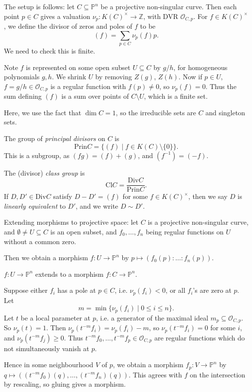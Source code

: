 \documentclass[12pt]{article}
\begin{document}
The setup is follows: let $C \subseteq \mathbb{P}^n$ be a projective non-singular curve. Then each point $p \in C$ gives a valuation $\nu_p : K(C)^\times \to \mathbb{Z}$, with DVR $\mathcal{O}_{C, p}$. For $f \in K(C)^\times$, we define the divisor of zeros and poles of $f$ to be
\[
	(f) = \sum_{p \in C} \nu_p(f) p.
\]
We need to check this is finite.

Note $f$ is represented on some open subset $U \subseteq C$ by $g/h$, for homogeneous polynomials $g, h$. We shrink $U$ by removing $Z(g)$, $Z(h)$. Now if $p \in U$, $f = g/h \in \mathcal{O}_{C, p}$ is a regular function with $f(p) \neq 0$, so $\nu_p(f) = 0$. Thus the sum defining $(f)$ is a sum over points of $C \setminus U$, which is a finite set.

Here, we use the fact that $\dim C = 1$, so the irreducible sets are $C$ and singleton sets.

\begin{definition}
	The group of \emph{principal divisors} on $C$ is
	\[
		\mathrm{Prin} C = \{(f) \mid f \in K(C) \setminus \{0\}\}.
	\]
	This is a subgroup, as $(fg) = (f) + (g)$, and $(f^{-1}) = (-f)$.

	The (divisor) \emph{class group} is
	\[
	\mathrm{Cl} C = \frac{\mathrm{Div} C}{\mathrm{Prin} C}.
	\]
	If $D, D' \in \mathrm{Div} C$ satisfy $D - D' = (f)$ for some $f \in K(C)^\times$, then we say $D$ is \emph{linearly equivalent} to $D'$, and we write $D \sim D'$.
\end{definition}

Extending morphisms to projective space: let $C$ is a projective non-singular curve, and $\emptyset \neq U \subseteq C$ is an open subset, and $f_0, \ldots, f_n$ being regular functions on $U$ without a common zero.

Then we obtain a morphism $f : U \to \mathbb{P}^n$ by $p \mapsto (f_0(p): \ldots: f_n(p))$.

\begin{theorem}
	$f : U \to \mathbb{P}^n$ extends to a morphism $f : C \to \mathbb{P}^n$.
\end{theorem}

\begin{proofbox}
	Suppose either $f_i$ has a pole at $p \in C$, i.e. $\nu_p(f_i) < 0$, or all $f_i$'s are zero at $p$. Let
	\[
		m = \min \{\nu_p(f_i) \mid 0 \leq i \leq n\}.
	\]
	Let $t$ be a local parameter at $p$, i.e. a generator of the maximal ideal $m_p \subseteq \mathcal{O}_{C, p}$. So $\nu_p(t) = 1$. Then $\nu_p(t^{-m} f_i) = \nu_p(f_i) - m$, so $\nu_p(t^{-m} f_i) = 0$ for some $i$, and $\nu_p(t^{-m} f_j) \geq 0$. Thus $t^{-m} f_0, \ldots, t^{-m} f_p \in \mathcal{O}_{C, p}$ are regular functions which do not simultaneously vanish at $p$.

	Hence in some neighbourhood $V$ of $p$, we obtain a morphism $f_p : V \to \mathbb{P}^n$ by $q \mapsto ((t^{-m} f_0)(q), \ldots, (t^{-m} f_n)(q))$. This agrees with $f$ on the intersection by rescaling, so gluing gives a morphism.
\end{proofbox}
\end{document}
